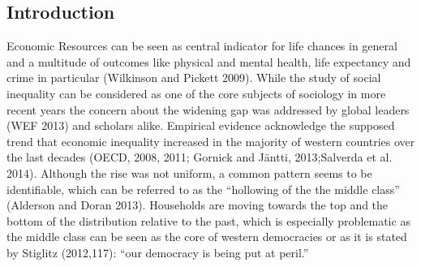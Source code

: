 \documentclass[twoside]{article}\usepackage[]{graphicx}\usepackage[]{color}
\begin{document}
\begin{multicols}{2} %




\section{Introduction}



Economic Resources can be seen as central indicator for life chances in general and a multitude of outcomes like physical and mental health, life expectancy and crime in particular (Wilkinson and Pickett 2009). While the study of social inequality can be considered as one of the core subjects of sociology in more recent years the concern about the widening gap was addressed by global leaders (WEF 2013) and scholars alike. Empirical evidence acknowledge the supposed trend that economic inequality increased in the majority of western countries over the last decades (OECD, 2008, 2011; Gornick and Jäntti, 2013;Salverda et al. 2014). Although the rise was not uniform, a common pattern seems to be identifiable, which can be referred to as the ``hollowing of the the middle class'' (Alderson and Doran 2013). Households are moving towards the top and the bottom of the distribution relative to the past, which is especially problematic as the middle class can be seen as the core of western democracies or as it is stated by Stiglitz (2012,117): ``our democracy is being put at peril.''
\\



\end{multicols}
\end{document}
